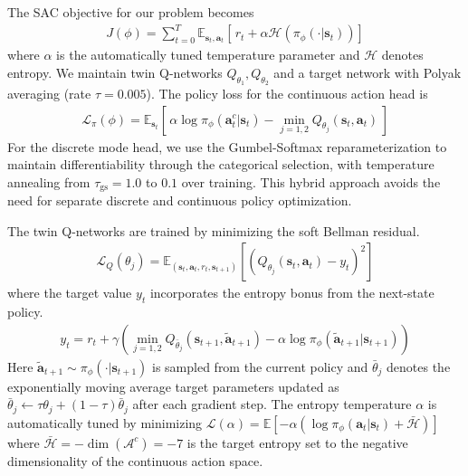 \documentclass[conference]{IEEEtran}
\begin{document}
The SAC objective for our problem becomes
\begin{align}
J(\phi) = \sum_{t=0}^{T} \mathbb{E}_{\boldsymbol{s}_t, \boldsymbol{a}_t}\!\left[\,r_t + \alpha \mathcal{H}\!\left(\pi_\phi(\cdot | \boldsymbol{s}_t)\right)\right]
\end{align}
where $\alpha$ is the automatically tuned temperature parameter and $\mathcal{H}$ denotes entropy. We maintain twin Q-networks $Q_{\theta_1}, Q_{\theta_2}$ and a target network with Polyak averaging (rate $\tau = 0.005$). The policy loss for the continuous action head is
\begin{align}
\mathcal{L}_\pi(\phi) = \mathbb{E}_{\boldsymbol{s}_t}\!\left[\,\alpha \log \pi_\phi(\boldsymbol{a}^c_t | \boldsymbol{s}_t) - \min_{j=1,2} Q_{\theta_j}(\boldsymbol{s}_t, \boldsymbol{a}_t)\,\right]
\end{align}
For the discrete mode head, we use the Gumbel-Softmax reparameterization to maintain differentiability through the categorical selection, with temperature annealing from $\tau_{\text{gs}} = 1.0$ to $0.1$ over training. This hybrid approach avoids the need for separate discrete and continuous policy optimization.

The twin Q-networks are trained by minimizing the soft Bellman residual.
\begin{align}
\mathcal{L}_Q(\theta_j) = \mathbb{E}_{(\boldsymbol{s}_t, \boldsymbol{a}_t, r_t, \boldsymbol{s}_{t+1})}\!\left[\left(Q_{\theta_j}(\boldsymbol{s}_t, \boldsymbol{a}_t) - y_t\right)^2\right]
\end{align}
where the target value $y_t$ incorporates the entropy bonus from the next-state policy.
\begin{align}
y_t = r_t + \gamma \left(\min_{j=1,2} Q_{\bar{\theta}_j}(\boldsymbol{s}_{t+1}, \tilde{\boldsymbol{a}}_{t+1}) - \alpha \log \pi_\phi(\tilde{\boldsymbol{a}}_{t+1} | \boldsymbol{s}_{t+1})\right)
\end{align}
Here $\tilde{\boldsymbol{a}}_{t+1} \sim \pi_\phi(\cdot | \boldsymbol{s}_{t+1})$ is sampled from the current policy and $\bar{\theta}_j$ denotes the exponentially moving average target parameters updated as $\bar{\theta}_j \leftarrow \tau \theta_j + (1-\tau) \bar{\theta}_j$ after each gradient step. The entropy temperature $\alpha$ is automatically tuned by minimizing $\mathcal{L}(\alpha) = \mathbb{E}[-\alpha (\log \pi_\phi(\boldsymbol{a}_t | \boldsymbol{s}_t) + \bar{\mathcal{H}})]$ where $\bar{\mathcal{H}} = -\dim(\mathcal{A}^c) = -7$ is the target entropy set to the negative dimensionality of the continuous action space.
\end{document}
